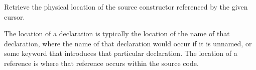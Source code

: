 Retrieve the physical location of the source constructor referenced by the given cursor. 

The location of a declaration is typically the location of the name of that declaration, where the name of that declaration would occur if it is unnamed, or some keyword that introduces that particular declaration. The location of a reference is where that reference occurs within the source code. 